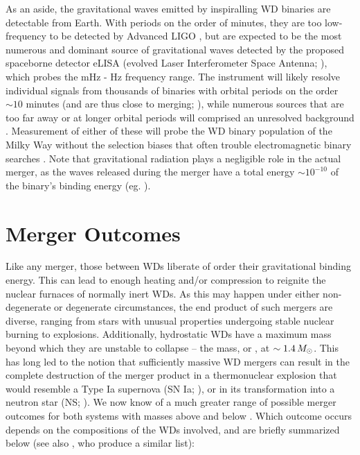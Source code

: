 As an aside, the gravitational waves emitted by inspiralling WD binaries are detectable from Earth.  With periods on the order of minutes, they are too low-frequency to be detected by Advanced LIGO \citep{ligo+15}, but are expected to be the most numerous and dominant source of gravitational waves \citep{mars11} detected by the proposed spaceborne detector eLISA (evolved Laser Interferometer Space Antenna; \citealt{amar+13}), which probes the mHz - Hz frequency range.  The instrument will likely resolve individual signals from thousands of binaries with orbital periods on the order $\sim10$ minutes (and are thus close to merging; \citealt{amar+13, mars11, dan+11}), while numerous sources that are too far away or at longer orbital periods will comprised an unresolved background \citep{neleyp01,amar+13}.  Measurement of either of these will probe the WD binary population of the Milky Way without the selection biases that often trouble electromagnetic binary searches \citep{mars11}.  Note that gravitational radiation plays a negligible role in the actual merger, as the waves released during the merger have a total energy $\sim10^{-10}$ of the binary's binding energy (eg. \citeal{loreig09}).


\section{Merger Outcomes}
\label{sec:c1_mergeroutcomes}

Like any merger, those between WDs liberate of order their gravitational binding energy.  This can lead to enough heating and/or compression to reignite the nuclear furnaces of normally inert WDs.  As this may happen under either non-degenerate or degenerate circumstances, the end product of such mergers are diverse, ranging from stars with unusual properties undergoing stable nuclear burning to explosions. Additionally, hydrostatic WDs have a maximum mass beyond which they are unstable to collapse -- the \cite{chan31} mass, or \Mch, at $\sim1.4\,\Msun$.  This has long led to the notion that sufficiently massive WD mergers can result in the complete destruction of the merger product in a thermonuclear explosion that would resemble a Type Ia supernova (SN Ia; \citealt{webb84}), or in its transformation into a neutron star (NS; \citealt{nomoi85, saion85}).  We now know of a much greater range of possible merger outcomes for both systems with masses above and below \Mch.  Which outcome occurs depends on the compositions of the WDs involved, and are briefly summarized below (see also \citealt{dan+14}, who produce a similar list):

